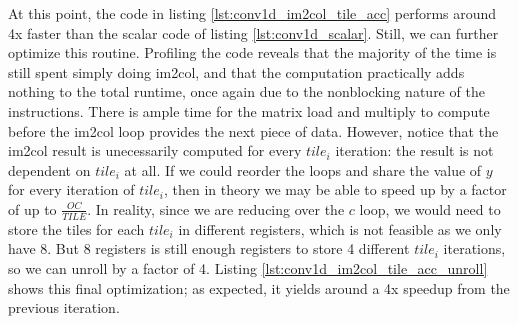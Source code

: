 \documentclass[acmsmall, nonacm=true]{acmart}
\begin{document}
At this point, the code in listing \ref{lst:conv1d_im2col_tile_acc} performs around 4x faster than the scalar code of listing \ref{lst:conv1d_scalar}. Still, we can further optimize this routine. Profiling the code reveals that the majority of the time is still spent simply doing im2col, and that the computation practically adds nothing to the total runtime, once again due to the nonblocking nature of the instructions. There is ample time for the matrix load and multiply to compute before the im2col loop provides the next piece of data. However, notice that the im2col result is unecessarily computed for every $tile_i$ iteration: the result is not dependent on $tile_i$ at all. If we could reorder the loops and share the value of $y$ for every iteration of $tile_i$, then in theory we may be able to speed up by a factor of up to $\frac{OC}{TILE}$. In reality, since we are reducing over the $c$ loop, we would need to store the tiles for each $tile_i$ in different registers, which is not feasible as we only have 8. But 8 registers is still enough registers to store 4 different $tile_i$ iterations, so we can unroll by a factor of 4. Listing \ref{lst:conv1d_im2col_tile_acc_unroll} shows this final optimization; as expected, it yields around a 4x speedup from the previous iteration.
\end{document}
